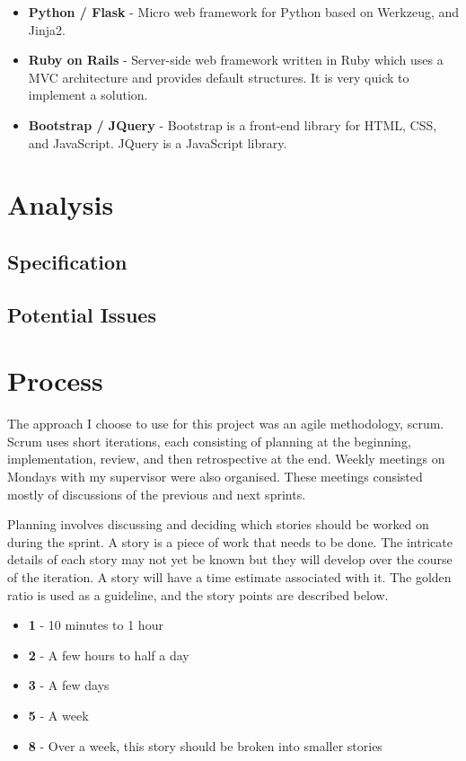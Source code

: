 \begin{itemize}
  \item \textbf{Python / Flask} - Micro web framework for Python based on Werkzeug, and Jinja2.
  \item \textbf{Ruby on Rails} - Server-side web framework written in Ruby which uses a MVC architecture and provides default structures. It is very quick to implement a solution.
  \item \textbf{Bootstrap / JQuery} - Bootstrap is a front-end library for HTML, CSS, and JavaScript. JQuery is a JavaScript library.
\end{itemize}

\section{Analysis}

\subsection{Specification}

\subsection{Potential Issues}

\section{Process}
The approach I choose to use for this project was an agile methodology, scrum. Scrum uses short iterations, each consisting of planning at the beginning, implementation, review, and then retrospective at the end. Weekly meetings on Mondays with my supervisor were also organised. These meetings consisted mostly of discussions of the previous and next sprints.

Planning involves discussing and deciding which stories should be worked on during the sprint. A story is a piece of work that needs to be done. The intricate details of each story may not yet be known but they will develop over the course of the iteration. A story will have a time estimate associated with it. The golden ratio is used as a guideline, and the story points are described below.

\begin{itemize}
  \item \textbf{1} - 10 minutes to 1 hour
  \item \textbf{2} - A few hours to half a day
  \item \textbf{3} - A few days
  \item \textbf{5} - A week
  \item \textbf{8} - Over a week, this story should be broken into smaller stories
\end{itemize}

